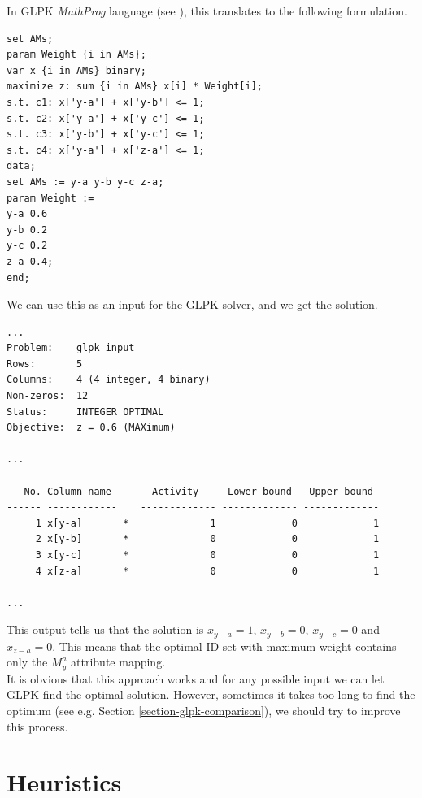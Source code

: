 In GLPK \textit{MathProg} language (see \cite{mathprog}), this translates to the following formulation.

\begin{scriptsize}
\begin{verbatim}
set AMs;
param Weight {i in AMs};
var x {i in AMs} binary;
maximize z: sum {i in AMs} x[i] * Weight[i];
s.t. c1: x['y-a'] + x['y-b'] <= 1;
s.t. c2: x['y-a'] + x['y-c'] <= 1;
s.t. c3: x['y-b'] + x['y-c'] <= 1;
s.t. c4: x['y-a'] + x['z-a'] <= 1;
data;
set AMs := y-a y-b y-c z-a;
param Weight :=
y-a 0.6
y-b 0.2
y-c 0.2
z-a 0.4;
end;
\end{verbatim}
\end{scriptsize}

We can use this as an input for the GLPK solver, and we get the solution.

\begin{scriptsize}
\begin{verbatim}
...
Problem:    glpk_input
Rows:       5
Columns:    4 (4 integer, 4 binary)
Non-zeros:  12
Status:     INTEGER OPTIMAL
Objective:  z = 0.6 (MAXimum)

...

   No. Column name       Activity     Lower bound   Upper bound
------ ------------    ------------- ------------- -------------
     1 x[y-a]       *              1             0             1 
     2 x[y-b]       *              0             0             1 
     3 x[y-c]       *              0             0             1 
     4 x[z-a]       *              0             0             1 

...
\end{verbatim}
\end{scriptsize}

This output tells us that the solution is $x_{y-a} = 1$, $x_{y-b} = 0$, $x_{y-c} = 0$ and $x_{z-a} = 0$. This means that the optimal ID set with maximum weight contains only the $M_{y}^{a}$ attribute mapping.\\

It is obvious that this approach works and for any possible input we can let GLPK find the optimal solution. However, sometimes it takes too long to find the optimum (see e.g. Section \ref{section-glpk-comparison}), we should try to improve this process.

\section{Heuristics}
\label{section-mip-heuristics}

